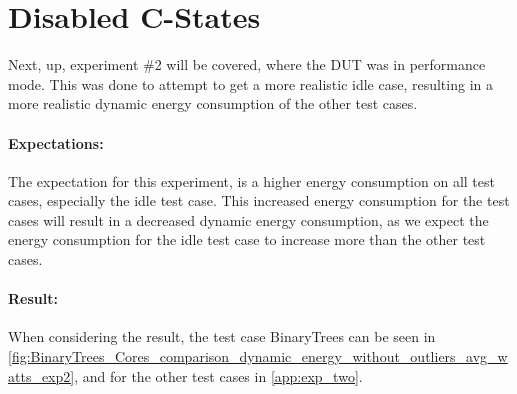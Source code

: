 \section{Disabled C-States}

Next, up, experiment \#2 will be covered, where the DUT was in performance mode. This was done to attempt to get a more realistic idle case, resulting in a more realistic dynamic energy consumption of the other test cases.

\paragraph*{Expectations:} The expectation for this experiment, is a higher energy consumption on all test cases, especially the idle test case. This increased energy consumption for the test cases will result in a decreased dynamic energy consumption, as we expect the energy consumption for the idle test case to increase more than the other test cases.

\paragraph*{Result:} When considering the result, the test case BinaryTrees can be seen in \cref{fig:BinaryTrees_Cores_comparison_dynamic_energy_without_outliers_avg_watts_exp2}, and for the other test cases in \cref{app:exp_two}.


%
%
